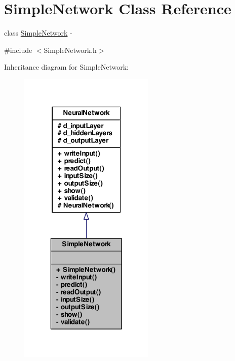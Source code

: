 \hypertarget{class_simple_network}{
\section{SimpleNetwork Class Reference}
\label{class_simple_network}
}


class \hyperlink{class_simple_network}{SimpleNetwork} -\/  




{\ttfamily \#include $<$SimpleNetwork.h$>$}



Inheritance diagram for SimpleNetwork:
\nopagebreak
\begin{figure}[H]
\begin{center}
\leavevmode
\includegraphics[width=184pt]{class_simple_network__inherit__graph}
\end{center}
\end{figure}


